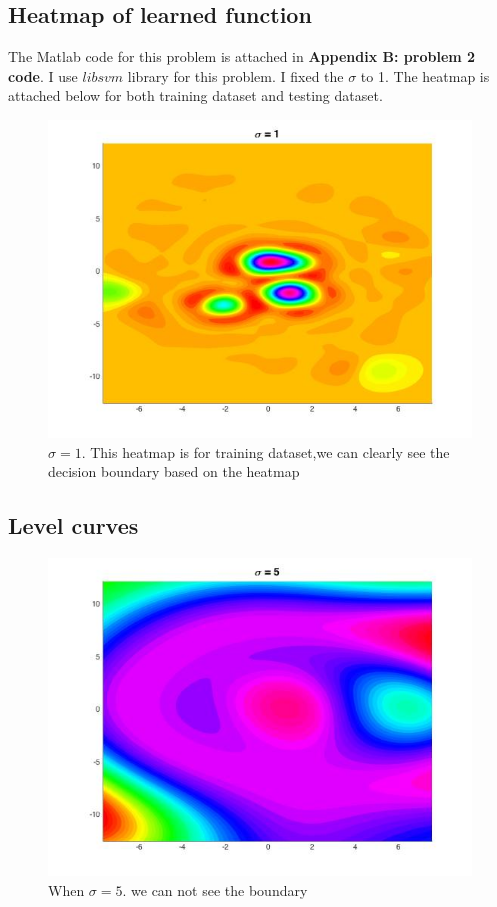 \documentclass[twoside]{article}
\theoremstyle{definition}
\theoremstyle{definition}
\theoremstyle{remark}
\begin{document}
\subsection{Heatmap of learned function}
The Matlab code for this problem is attached in \textbf{Appendix B: problem 2 code}. I use $libsvm$ library for this problem. I fixed the $\sigma$ to 1. The heatmap is attached below for both training dataset and testing dataset.
  
\begin{figure}[H]
\centering
\includegraphics[width=120mm]{sigma_1.jpg}
\caption{ $\sigma = 1$. This heatmap is for training dataset,we can clearly see the decision boundary based on the heatmap\label{problem2Pic1}}
\end{figure}

\subsection{Level curves}
\begin{figure}[H]
\centering
\includegraphics[width=120mm]{sigma_5.jpg}
\caption{ When $\sigma = 5$. we can not see the boundary \label{problem2Pic2}}
\end{figure}
\end{document}
